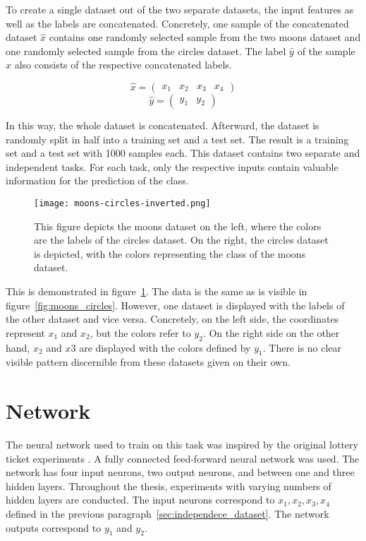 To create a single dataset out of the two separate datasets, the input features as well as the labels are concatenated.
Concretely, one sample of the concatenated dataset $\hat x$ contains one randomly selected sample from the two moons dataset and one randomly selected sample from the circles dataset.
The label $\hat y$ of the sample $\hat x$ also consists of the respective concatenated labels.

\[\hat x = \begin{pmatrix} x_1 & x_2 & x_3 & x_4 \end{pmatrix}\]
\[\hat y = \begin{pmatrix} y_1 & y_2 \end{pmatrix}\]

In this way, the whole dataset is concatenated.
Afterward, the dataset is randomly split in half into a training set and a test set.
The result is a training set and a test set with 1000 samples each.
This dataset contains two separate and independent tasks.
For each task, only the respective inputs contain valuable information for the prediction of the class.

\begin{figure}[ht]
    \centering
    \texttt{[image: moons-circles-inverted.png]}
    \caption{
        This figure depicts the moons dataset on the left, where the colors are the labels of the circles dataset.
        On the right, the circles dataset is depicted, with the colors representing the class of the moons dataset.
    }\label{fig:moons_circles_inverted}
\end{figure}

This is demonstrated in figure~\ref{fig:moons_circles_inverted}.
The data is the same as is visible in figure~\ref{fig:moons_circles}. 
However, one dataset is displayed with the labels of the other dataset and vice versa.
Concretely, on the left side, the coordinates represent $x_1$ and $x_2$, but the colors refer to $y_2$.
On the right side on the other hand, $x_2$ and $x3$ are displayed with the colors defined by $y_1$.
There is no clear visible pattern discernible from these datasets given on their own.

\section{Network}
The neural network used to train on this task was inspired by the original lottery ticket experiments \autocite{LTH}. 
A fully connected feed-forward neural network was used.
The network has four input neurons, two output neurons, and between one and three hidden layers.
Throughout the thesis, experiments with varying numbers of hidden layers are conducted.
The input neurons correspond to $x_1, x_2, x_3, x_4$ defined in the previous paragraph~\ref{sec:independece_dataset}.
The network outputs correspond to $y_1$ and $y_2$.

